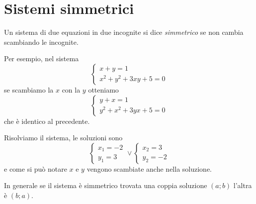% 
% 

\section{Sistemi simmetrici}
\label{sec:eq2gr_sistemi_simmetrici}

Un sistema di due equazioni in due incognite si dice \emph{simmetrico} se non 
cambia scambiando le incognite.

Per esempio, nel sistema 
\[\left\{\begin{array}{l}{x+y=1}\\{x^2+y^2+3{xy}+5=0}\end{array}\right.\] se 
scambiamo la $x$ con la $y$ otteniamo 
\[\left\{\begin{array}{l}{y+x=1}\\{y^2+x^2+3{yx}+5=0}\end{array}\right.\] che è 
identico al precedente.

Risolviamo il sistema, le soluzioni sono 
\[\left\{\begin{array}{l}{x_1=-2}\\{y_1=3}\end{array}\right.\vee 
\left\{\begin{array}{l}{x_2=3}\\{y_2=-2}\end{array}\right.\] 
e come si può notare $x$ e $y$ vengono scambiate anche nella soluzione.

In generale se il sistema è simmetrico trovata una coppia soluzione $(a;b)$ 
l'altra è $(b;a)$.

